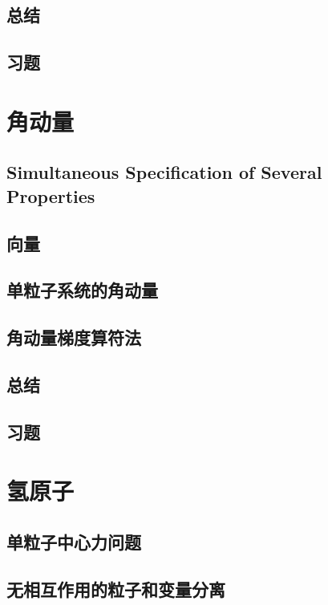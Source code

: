 \documentclass{book}
\begin{document}
	\section*{总结}
	
	\section*{习题}
	
	\chapter{角动量}
	\section{Simultaneous Specification of Several Properties}
	
	\section{向量}
	
	\section{单粒子系统的角动量}
	
	\section{角动量梯度算符法}
	
	\section*{总结}
	
	\section*{习题}
	
	\chapter{氢原子}
	\section{单粒子中心力问题}
	
	\section{无相互作用的粒子和变量分离}
	
\end{document}
